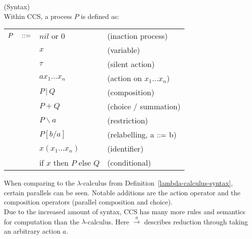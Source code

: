     \begin{definition}{(Syntax)\\}
        Within CCS, a process $P$ is defined as:
        \begin{center}
            \begin{tabular}{ l l l }
                $P \quad ::=$    & $nil$ or $0$              & (inaction process) \\
                                    & $x$                       & (variable) \\
                                    & $\tau$                    & (silent action) \\
                                    & $a x_1 \ldots x_n$        & (action on $x_1 \ldots x_n$)~\footnotemark\\
                                    & $P \, | \, Q$             & (composition) \\
                                    & $P + Q$                   & (choice / summation)\\
                                    & $P \backslash a$          & (restriction) \\
                                    & $P[b / a]$                & (relabelling, a $::=$ b)~\footnotemark\\
                                    & $x(x_1 \ldots x_n)$       & (identifier) \\
                                    & if $x$ then $P$ else $Q$  & (conditional)
            \end{tabular}
        \end{center}
        \addtocounter{footnote}{-2}
    \end{definition}
    When comparing to the $\lambda$-calculus from Definition~\ref{lambda-calculus-syntax}, certain parallels can be seen.
    Notable additions are the action operator and the composition operators (parallel composition and choice). \\


    Due to the increased amount of syntax, CCS has many more rules and semantics for computation than the $\lambda$-calculus.
    Here $\xrightarrow{a}$ describes reduction through taking an arbitrary action $a$.

